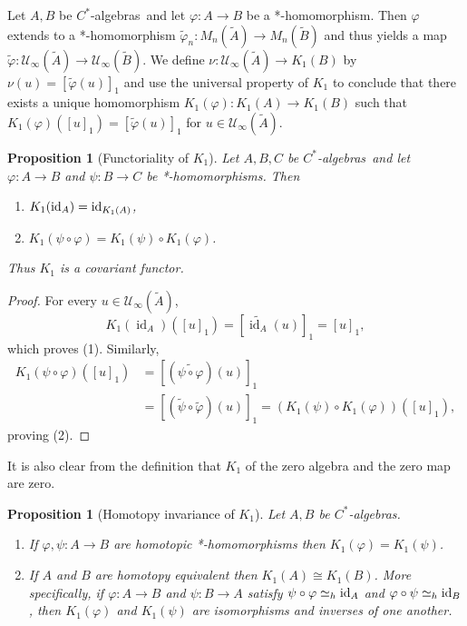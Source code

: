 \documentclass{book}
\newtheorem{proposition}[definition]{Proposition}
\def\cstars{\(C^*\)-algebras}
\begin{document}
Let \(A,B\) be \cstars\ and let \(\varphi:A\rightarrow B\) be a *-homomorphism. Then \(\varphi\) extends to a
*-homomorphism \(\tilde{\varphi}_n:M_n(\tilde{A})\rightarrow M_n(\tilde{B})\) and thus yields a map
\(\tilde{\varphi}:\mathcal{U}_\infty(\tilde{A})\rightarrow \mathcal{U}_\infty(\tilde{B})\).
We define \(\nu:\mathcal{U}_\infty(\tilde{A})\rightarrow K_1(B)\) by \(\nu(u)={[\tilde{\varphi}(u)]}_1\) and use the universal property of \(K_1\)
to conclude that there exists a unique homomorphism \(K_1(\varphi):K_1(A)\rightarrow K_1(B)\) such that \(K_1(\varphi)({[u]}_1)={[\tilde{\varphi}(u)]}_1\) for \(u\in\mathcal{U}_\infty(\tilde{A})\).
\begin{proposition}[Functoriality of \(K_1\)]
  Let \(A,B,C\) be \cstars\ and let \(\varphi:A\rightarrow B\) and \(\psi:B\rightarrow C\) be *-homomorphisms. Then
  \begin{enumerate}
    \item \(K_1(\textnormal{id}_A)=\textnormal{id}_{K_1(A)}\),
    \item \(K_1(\psi\circ\varphi)=K_1(\psi)\circ K_1(\varphi)\).
  \end{enumerate}
  Thus \(K_1\) is a covariant functor.
\end{proposition}
\begin{proof}
  For every \(u\in\mathcal{U}_\infty(\tilde A)\),
  \[
    K_1(\operatorname{id}_A)({[u]}_1)
    ={[\widetilde{\operatorname{id}_A}(u)]}_1={[u]}_1,
  \]
  which proves (1). Similarly,
  \begin{align*}
    K_1(\psi\circ\varphi)({[u]}_1)
      &={[(\widetilde{\psi\circ\varphi})(u)]}_1\\
      &={[(\tilde\psi\circ\tilde\varphi)(u)]}_1
       =(K_1(\psi)\circ K_1(\varphi))({[u]}_1),
  \end{align*}
  proving (2).
\end{proof}
It is also clear from the definition that \(K_1\) of the zero algebra and the zero map are zero.
\begin{proposition}[Homotopy invariance of \(K_1\)]
  Let \(A,B\) be \cstars.
  \begin{enumerate}
    \item If \(\varphi,\psi:A\rightarrow B\) are homotopic *-homomorphisms then \(K_1(\varphi)=K_1(\psi)\).
    \item If \(A\) and \(B\) are homotopy equivalent then \(K_1(A)\cong K_1(B)\). More specifically,
    if \(\varphi:A\rightarrow B\) and \(\psi:B\rightarrow A\) satisfy
    \(\psi\circ\varphi\simeq_h\textnormal{id}_A\) and
    \(\varphi\circ\psi\simeq_h\textnormal{id}_B\), then \(K_1(\varphi)\) and
    \(K_1(\psi)\) are isomorphisms and inverses of one another.
  \end{enumerate}
\end{proposition}
\end{document}
